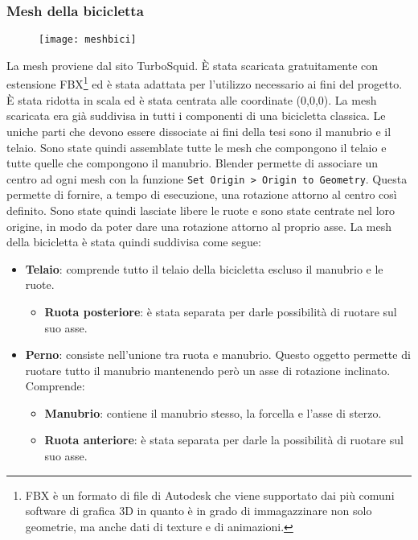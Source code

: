 \subsubsection{Mesh della bicicletta}
 \begin{figure}[htb]
    \centering
    \texttt{[image: meshbici]}
\end{figure}
\noindent La mesh proviene dal sito TurboSquid. È stata scaricata gratuitamente con estensione FBX\footnote{FBX è un formato di file di Autodesk che viene supportato dai più comuni software di grafica 3D in quanto è in grado di immagazzinare non solo geometrie, ma anche dati di texture e di animazioni.} ed è stata adattata per l'utilizzo necessario ai fini del progetto. È stata ridotta in scala ed è stata centrata alle coordinate (0,0,0). La mesh scaricata era già suddivisa in tutti i componenti di una bicicletta classica. Le uniche parti che devono essere dissociate ai fini della tesi sono il manubrio e il telaio. Sono state quindi assemblate tutte le mesh che compongono il telaio e tutte quelle che compongono il manubrio. Blender permette di associare un centro ad ogni mesh con la funzione \texttt{Set Origin > Origin to Geometry}. Questa permette di fornire, a tempo di esecuzione, una rotazione attorno al centro così definito. Sono state quindi lasciate libere le ruote e sono state centrate nel loro origine, in modo da poter dare una rotazione attorno al proprio asse.
\noindent La mesh della bicicletta è stata quindi suddivisa come segue:
\begin{itemize}
  \item \textbf{Telaio}: comprende tutto il telaio della bicicletta escluso il manubrio e le ruote.
	\begin{itemize}
  \item \textbf{Ruota posteriore}: è stata separata per darle possibilità di ruotare sul suo asse.
 \end{itemize}
  \item \textbf{Perno}: consiste nell'unione tra ruota e manubrio. Questo oggetto permette di ruotare tutto il manubrio mantenendo però un asse di rotazione inclinato. Comprende:
 \begin{itemize}
 \item \textbf{Manubrio}: contiene il manubrio stesso, la forcella e l'asse di sterzo.
 \item \textbf{Ruota anteriore}: è stata separata per darle la possibilità di ruotare sul suo asse.
 \end{itemize}
\end{itemize}

